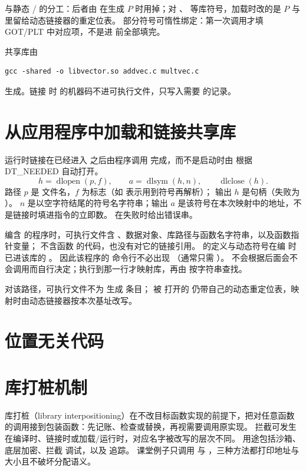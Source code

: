 与静态 / 的分工：后者由  在生成 $P$ 时用掉；对 、 等库符号，加载时改的是 $P$ 与  里留给动态链接器的重定位表。
部分符号可惰性绑定：第一次调用才填 GOT/PLT 中对应项，不是进  前全部填完。

共享库由
\begin{lstlisting}
gcc -shared -o libvector.so addvec.c multvec.c
\end{lstlisting}
生成。链接  时  的机器码不进可执行文件，只写入需要  的记录。

\section{从应用程序中加载和链接共享库}

运行时链接在已经进入  之后由程序调用  完成，而不是启动时由  根据 DT\_NEEDED 自动打开。
\[
h=\operatorname{dlopen}(p,f),\qquad
a=\operatorname{dlsym}(h,n),\qquad
\operatorname{dlclose}(h).
\]
路径 $p$ 是  文件名，$f$ 为标志（如  表示用到符号再解析）；
输出 $h$ 是句柄（失败为 ）。
$n$ 是以空字符结尾的符号名字符串；输出 $a$ 是该符号在本次映射中的地址，不是链接时填进指令的立即数。
 在失败时给出错误串。

编含  的程序时，可执行文件含 、数据对象、库路径与函数名字符串，以及函数指针变量；
不含函数  的代码，也没有对它的链接引用。
 的定义与动态符号在编  时已进该库的 。
因此该程序的  命令行不必出现 （通常只需 ）。
 不会根据后面会不会调用而自行决定；执行到那一行才映射库，再由  按字符串查找。

对该路径，可执行文件不为  生成  条目；
被  打开的  仍带自己的动态重定位表，映射时由动态链接器按本次基址改写。

\section{位置无关代码}

\pending

\section{库打桩机制}

库打桩（library interpositioning）在不改目标函数实现的前提下，把对任意函数的调用接到包装函数：先记账、检查或替换，再视需要调用原实现。
拦截可发生在编译时、链接时或加载/运行时，对应名字被改写的层次不同。
用途包括沙箱、底层加密、拦截  调试，以及  追踪。
课堂例子只调用  与 ，三种方法都打印地址与大小且不破坏分配语义。

